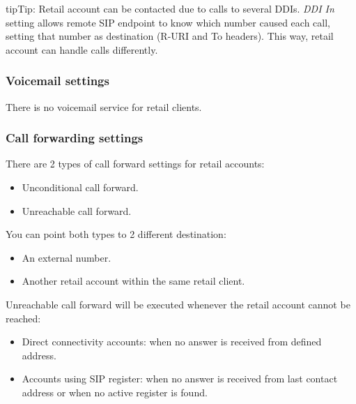 \documentclass[letterpaper,10pt,english]{sphinxmanual}
\begin{document}
\begin{notice}{tip}{Tip:}
Retail account can be contacted due to calls to several DDIs. \emph{DDI In} setting allows remote SIP endpoint to
know which number caused each call, setting that number as destination (R-URI and To headers). This way, retail
account can handle calls differently.
\end{notice}


\subsubsection{Voicemail settings}
\label{administration_portal/client/retail/retail_accounts:voicemail-settings}
There is no voicemail service for retail clients.


\subsubsection{Call forwarding settings}
\label{administration_portal/client/retail/retail_accounts:call-forwarding-settings}
There are 2 types of call forward settings for retail accounts:
\begin{itemize}
\item {} 
Unconditional call forward.

\item {} 
Unreachable call forward.

\end{itemize}

You can point both types to 2 different destination:
\begin{itemize}
\item {} 
An external number.

\item {} 
Another retail account within the same retail client.

\end{itemize}

Unreachable call forward will be executed whenever the retail account cannot be reached:
\begin{itemize}
\item {} 
Direct connectivity accounts: when no answer is received from defined address.

\item {} 
Accounts using SIP register: when no answer is received from last contact address or when no active register is found.

\end{itemize}
\end{document}
